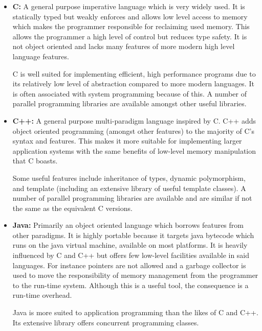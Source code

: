 \begin{itemize}
\item \textbf{C:} 
            A general purpose imperative language which is very widely used.
            It is statically typed but weakly enforces and allows low level access to memory which 
            makes the programmer responsible for reclaiming used memory.
            This allows the programmer a high level of control but reduces type safety.
            It is not object oriented and lacks many features of more modern high level
            language features.
            
            C is well suited for implementing efficient, high performance programs due to
            its relatively low level of abstraction compared to more modern languages.
            It is often associated with system programming because of this.
            A number of parallel programming libraries are available amongst other useful 
            libraries.

\item \textbf{C++:}
            A general purpose multi-paradigm language inspired by C.
            C++ adds object oriented programming (amongst other features) to the majority 
            of C's syntax and features. 
            This makes it more suitable for implementing larger application systems 
            with the same benefits of low-level memory manipulation that C boasts.
            
            Some useful features include inheritance of types, dynamic polymorphism, 
            and template (including an extensive library of useful template classes).
            A number of parallel programming libraries are available and are similar 
            if not the same as the equivalent C versions.
            
\item \textbf{Java:}
            Primarily an object oriented language which borrows features from other paradigms.
            It is highly portable because it targets java bytecode which runs on the java virtual machine, available on most platforms.
            It is heavily influenced by C and C++ but offers few low-level facilities available in said languages. 
            For instance pointers are not allowed and a garbage collector is used to move
            the responsibility of memory management from the programmer to the run-time system.
            Although this is a useful tool, the consequence is a run-time overhead.
            
            Java is more suited to application programming than the likes of C and C++.
            Its extensive library offers concurrent programming classes.
            
\end{itemize}

